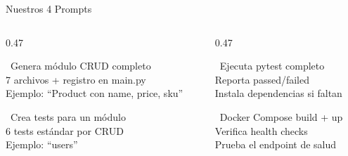 \documentclass[aspectratio=169,11pt]{beamer}
\begin{document}
\begin{frame}{Nuestros 4 Prompts}
  \begin{columns}[T]
    \begin{column}{0.47\textwidth}
      \begin{tcolorbox}[colback=ixtiGreen!5, colframe=ixtiGreen!70!black, title={\texttt{/new-crud}}, fonttitle=\small\bfseries\ttfamily, coltitle=white]
        \small
        \faPlus\ Genera m\'odulo CRUD completo\\
        7 archivos + registro en main.py\\[4pt]
        \textcolor{ixtiLightGray}{\footnotesize Ejemplo: ``Product con name, price, sku''}
      \end{tcolorbox}

      \vspace{0.2em}
      \begin{tcolorbox}[colback=ixtiGreen!5, colframe=ixtiGreen!70!black, title={\texttt{/generate-tests}}, fonttitle=\small\bfseries\ttfamily, coltitle=white]
        \small
        \faVial\ Crea tests para un m\'odulo\\
        6 tests est\'andar por CRUD\\[4pt]
        \textcolor{ixtiLightGray}{\footnotesize Ejemplo: ``users''}
      \end{tcolorbox}
    \end{column}
    \begin{column}{0.47\textwidth}
      \begin{tcolorbox}[colback=ixtiTeal!5, colframe=ixtiTeal, title={\texttt{/run-tests}}, fonttitle=\small\bfseries\ttfamily, coltitle=white]
        \small
        \faPlay\ Ejecuta pytest completo\\
        Reporta passed/failed\\[4pt]
        \textcolor{ixtiLightGray}{\footnotesize Instala dependencias si faltan}
      \end{tcolorbox}

      \vspace{0.2em}
      \begin{tcolorbox}[colback=ixtiTeal!5, colframe=ixtiTeal, title={\texttt{/deploy}}, fonttitle=\small\bfseries\ttfamily, coltitle=white]
        \small
        \faDocker\ Docker Compose build + up\\
        Verifica health checks\\[4pt]
        \textcolor{ixtiLightGray}{\footnotesize Prueba el endpoint de salud}
      \end{tcolorbox}
    \end{column}
  \end{columns}
\end{frame}
\end{document}
